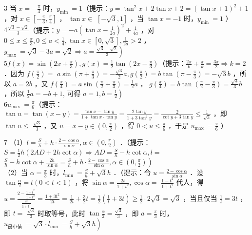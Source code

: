 \documentclass[10pt]{article}
\begin{document}
3 当 \(x=-\frac{\pi}{4}\) 时，\(y_{\text {min }}=1\)（提示：\(y=\tan ^{2} x+2 \tan x+2=(\tan x+1)^{2}+1\) ，对 \(x \in\left[-\frac{\pi}{3}, \frac{\pi}{4}\right]\) ， \(\tan x \in\) \([-\sqrt{3}, 1]\) ，当 \(\tan x=-1\) 时，\(y_{\text {min }}=1\) ）\\
\(4 \frac{\sqrt{3}-\sqrt{2}}{3}\)（提示：\(y=-a\left(\tan x-\frac{1}{2 a}\right)^{2}+\frac{1}{4 a}\) ，对 \(0 \leqslant x \leqslant \frac{\pi}{3}, 0 \leqslant a<\frac{1}{4}, \tan x \in[0, \sqrt{3}], \frac{1}{2 a}>2\) ，\\
\(\left.y_{\text {max }}=\sqrt{3}-3 a=\sqrt{2} \Rightarrow a=\frac{\sqrt{3}-\sqrt{2}}{3}\right)\)\\
\(5 f(x)=\sin \left(2 x+\frac{\pi}{3}\right), g(x)=\frac{1}{2} \tan \left(2 x-\frac{\pi}{3}\right)\)（提示：\(\frac{2 \pi}{k}+\frac{\pi}{k}=\frac{3 \pi}{2} \Rightarrow k=2\) ．因为 \(f\left(\frac{\pi}{2}\right)=\) \(a \sin \left(\pi+\frac{\pi}{3}\right)=-\frac{\sqrt{3}}{2} a, g\left(\frac{\pi}{2}\right)=b \tan \left(\pi-\frac{\pi}{3}\right)=-\sqrt{3} b\) ，所以 \(a=2 b\) ，又 \(f\left(\frac{\pi}{4}\right)=a \sin \left(\frac{\pi}{2}+\frac{\pi}{3}\right)=\frac{1}{2} a\) ， \(g\left(\frac{\pi}{4}\right)=b \tan \left(\frac{\pi}{2}-\frac{\pi}{3}\right)=\frac{\sqrt{3}}{3} b\) ，所以 \(\frac{1}{2} a=-b+1\), 可得 \(\left.a=1, b=\frac{1}{2}\right)\)\\
\(6 u_{\text {max }}=\frac{\pi}{6}\)（提示： \(\tan u=\tan (x-y)=\frac{\tan x-\tan y}{1+\tan x \cdot \tan y}=\frac{2 \tan y}{1+3 \tan ^{2} y}=\frac{2}{\cot y+3 \tan y} \leqslant \frac{1}{\sqrt{3}}\) ，即 \(\tan u \leqslant\) \(\frac{\sqrt{3}}{3}\) ，又 \(u=x-y \in\left(0, \frac{\pi}{2}\right)\) ，得 \(0<u \leqslant \frac{\pi}{6}\) ，于是 \(u_{\text {max }}=\frac{\pi}{6}\) ）

7 （1）\(l=\frac{S}{h}+h \cdot \frac{2-\cos \alpha}{\sin \alpha}, \alpha \in\left(0, \frac{\pi}{2}\right)\) ．（提示：\(S=\frac{1}{2} h(2 A D+2 h \cot \alpha) \Rightarrow A D=\frac{S}{h}-h \cot \alpha, l=\) \(\left.\frac{S}{h}-h \cot \alpha+\frac{2 h}{\sin \alpha}=\frac{S}{h}+h \cdot \frac{2-\cos \alpha}{\sin \alpha}, \alpha \in\left(0, \frac{\pi}{2}\right)\right)\)\\
（2）当 \(\alpha=\frac{\pi}{3}\) 时，\(l_{\text {min }}=\frac{S}{h}+\sqrt{3} h\) ．（提示：令 \(u=\frac{2-\cos \alpha}{\sin \alpha}\) ．设 \(\tan \frac{\alpha}{2}=t(0<t<1)\) ，将 \(\sin \alpha=\frac{2 t}{1+t^{2}}, \cos \alpha=\) \(\frac{1-t^{2}}{1+t^{2}}\) 代人，得 \(u=\frac{2-\frac{1-t^{2}}{1+t^{2}}}{\frac{2 t}{1+t^{2}}}=\frac{1+3 t^{2}}{2 t}=\frac{1}{2 t}+\frac{3}{2} t=\frac{1}{2}\left(\frac{1}{t}+3 t\right) \geqslant \frac{1}{2} \cdot 2 \sqrt{3}=\sqrt{3}\) ，当且仅当 \(\frac{1}{t}=3 t\) ，即 \(t=\) \(\frac{\sqrt{3}}{3}\) 时取等号，此时 \(\tan \frac{\alpha}{2}=\frac{\sqrt{3}}{3}\) ，即 \(a=\frac{\pi}{3}\) 时，\(\left.u_{\text {最小值 }}=\sqrt{3} \cdot l_{\text {min }}=\frac{S}{h}+\sqrt{3} h\right)\)
\end{document}
